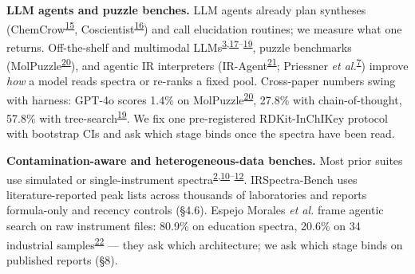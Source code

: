 \documentclass[
  10pt,
]{article}
\begin{document}
\textbf{LLM agents and puzzle benches.} LLM agents already plan
syntheses
(ChemCrow\textsuperscript{\protect\hyperlink{ref-mbran2024chemcrow}{15}},
Coscientist\textsuperscript{\protect\hyperlink{ref-boiko2023coscientist}{16}})
and call elucidation routines; we measure what one returns.
Off-the-shelf and multimodal
LLMs\textsuperscript{\protect\hyperlink{ref-kamber2026chemist}{3},\protect\hyperlink{ref-su2025spectrallm}{17}--\protect\hyperlink{ref-zhuang2025treesearch}{19}},
puzzle benchmarks
(MolPuzzle\textsuperscript{\protect\hyperlink{ref-guo2024molpuzzle}{20}}),
and agentic IR interpreters
(IR-Agent\textsuperscript{\protect\hyperlink{ref-noh2025iragent}{21}};
Priessner \emph{et
al.}\textsuperscript{\protect\hyperlink{ref-priessner2026reasoning}{7}})
improve \emph{how} a model reads spectra or re-ranks a fixed pool.
Cross-paper numbers swing with harness: GPT-4o scores 1.4\% on
MolPuzzle\textsuperscript{\protect\hyperlink{ref-guo2024molpuzzle}{20}},
27.8\% with chain-of-thought, 57.8\% with
tree-search\textsuperscript{\protect\hyperlink{ref-zhuang2025treesearch}{19}}.
We fix one pre-registered RDKit-InChIKey protocol with bootstrap CIs and
ask which stage binds once the spectra have been read.

\textbf{Contamination-aware and heterogeneous-data benches.} Most prior
suites use simulated or single-instrument
spectra\textsuperscript{\protect\hyperlink{ref-chacko2024spectro}{2},\protect\hyperlink{ref-ottomano2025nmiracle}{10}--\protect\hyperlink{ref-alberts2025benchmarks}{12}}.
IRSpectra-Bench uses literature-reported peak lists across thousands of
laboratories and reports formula-only and recency controls (§4.6).
Espejo Morales \emph{et al.} frame agentic search on raw instrument
files: 80.9\% on education spectra, 20.6\% on 34 industrial
samples\textsuperscript{\protect\hyperlink{ref-espejo2026agentic}{22}}
--- they ask which architecture; we ask which stage binds on published
reports (§8).
\end{document}
